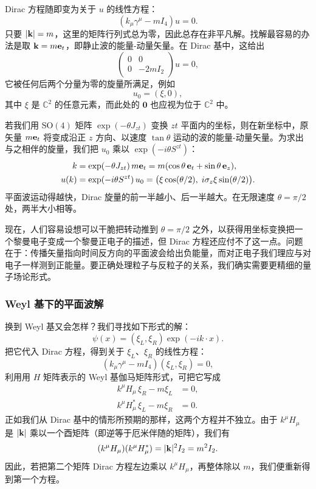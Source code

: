 Dirac 方程随即变为关于 $u$ 的线性方程：
\begin{equation}
(k_{\mu}\gamma^{\mu}-mI_{4})u=0.
\end{equation}
只要 $|\mathbf{k}|=m$，这里的矩阵行列式总为零，因此总存在非平凡解。找解最容易的办法是取 $\mathbf{k}=m\mathbf{e}_{t}$，即静止波的能量-动量矢量。在 Dirac 基中，这给出
\begin{equation}
\begin{pmatrix}0&0\\ 0&-2mI_{2}\end{pmatrix}u=0,
\end{equation}
它被任何后两个分量为零的旋量所满足，例如
\begin{equation}
u_{0}=(\xi,0),
\end{equation}
其中 $\xi$ 是 $\mathbb{C}^{2}$ 的任意元素，而此处的 $\mathbf{0}$ 也应视为位于 $\mathbb{C}^{2}$ 中。

若我们用 $\mathrm{SO}(4)$ 矩阵 $\exp(-\theta J_{zt})$ 变换 $zt$ 平面内的坐标，则在新坐标中，原矢量 $m\mathbf{e}_{t}$ 将变成沿正 $z$ 方向、以速度 $\tan\theta$ 运动的波的能量-动量矢量。为求出与之相伴的旋量，我们把 $u_{0}$ 乘以 $\exp(-i\theta S^{zt})$：
\begin{align*}
k &= \exp(-\theta J_{zt})\,m\mathbf{e}_{t}=m(\cos\theta\,\mathbf{e}_{t}+\sin\theta\,\mathbf{e}_{z}),\\
u(k) &= \exp(-i\theta S^{zt})\,u_{0}
=\bigl(\xi\cos(\theta/2),\; i\sigma_{z}\xi\sin(\theta/2)\bigr).
\end{align*}
平面波运动得越快，Dirac 旋量的前一半越小、后一半越大。在无限速度 $\theta=\pi/2$ 处，两半大小相等。

现在，人们容易设想可以干脆把转动推到 $\theta=\pi/2$ 之外，以获得用坐标变换把一个黎曼电子变成一个黎曼正电子的描述，但 Dirac 方程还应付不了这一点。问题在于：传播矢量指向时间反方向的平面波会给出负能量，而对正电子我们理应与对电子一样测到正能量。要正确处理粒子与反粒子的关系，我们确实需要更精细的量子场论形式。

\subsubsection{Weyl 基下的平面波解}

换到 Weyl 基又会怎样？我们寻找如下形式的解：
\begin{equation}
\psi(x)=(\xi_{L},\xi_{R})\exp(-ik\cdot x).
\end{equation}
把它代入 Dirac 方程，得到关于 $\xi_{L}$、$\xi_{R}$ 的线性方程：
\begin{equation}
(k_{\mu}\gamma^{\mu}-mI_{4})(\xi_{L},\xi_{R})=0,
\end{equation}
利用用 $H$ 矩阵表示的 Weyl 基伽马矩阵形式，可把它写成
\begin{align}
k^{\mu}H_{\mu}\,\xi_{R}-m\xi_{L}&=0,\\
k^{\mu}H_{\mu}^{*}\,\xi_{L}-m\xi_{R}&=0.
\end{align}
正如我们从 Dirac 基中的情形所预期的那样，这两个方程并不独立。由于 $k^{\mu}H_{\mu}$ 是 $|\mathbf{k}|$ 乘以一个酉矩阵（即逆等于厄米伴随的矩阵），我们有
\begin{equation}
(k^{\mu}H_{\mu})(k^{\mu}H_{\mu}^{*})=|\mathbf{k}|^{2}I_{2}=m^{2}I_{2}.
\end{equation}
因此，若把第二个矩阵 Dirac 方程左边乘以 $k^{\mu}H_{\mu}$，再整体除以 $m$，我们便重新得到第一个方程。

